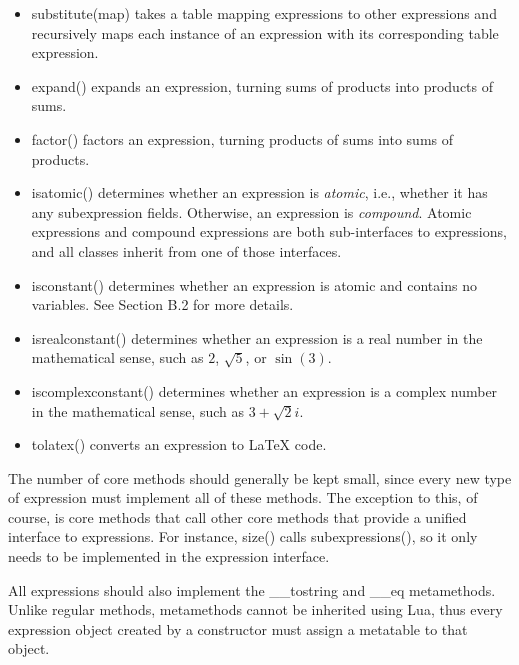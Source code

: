 \documentclass{article}
\begin{document}
\begin{itemize}
    \item {\ttfamily substitute(map)} takes a table mapping expressions to other expressions and recursively maps each instance of an expression with its corresponding table expression.
    
    \item {\ttfamily expand()} expands an expression, turning sums of products into products of sums.
    
    \item {\ttfamily factor()} factors an expression, turning products of sums into sums of products.
    
    \item {\ttfamily isatomic()} determines whether an expression is \emph{atomic}, i.e., whether it has any subexpression fields. Otherwise, an expression is \emph{compound}. Atomic expressions and compound expressions are both sub-interfaces to expressions, and all classes inherit from one of those interfaces.
    
    \item {\ttfamily isconstant()} determines whether an expression is atomic and contains no variables. See Section B.2 for more details.
    
    \item {\ttfamily isrealconstant()} determines whether an expression is a real number in the mathematical sense, such as $2$, $\sqrt{5}$, or $\sin(3)$.
    
    \item {\ttfamily iscomplexconstant()} determines whether an expression is a complex number in the mathematical sense, such as $3 + \sqrt{2}i$.
    
    \item {\ttfamily tolatex()} converts an expression to \LaTeX{} code.
\end{itemize}

The number of core methods should generally be kept small, since every new type of expression must implement all of these methods. The exception to this, of course, is core methods that call other core methods that provide a unified interface to expressions. For instance, {\ttfamily size()} calls {\ttfamily subexpressions()}, so it only needs to be implemented in the expression interface.

All expressions should also implement the {\ttfamily \_\_tostring} and {\ttfamily \_\_eq} metamethods. Unlike regular methods, metamethods cannot be inherited using Lua, thus every expression object created by a constructor must assign a metatable to that object.
\end{document}

